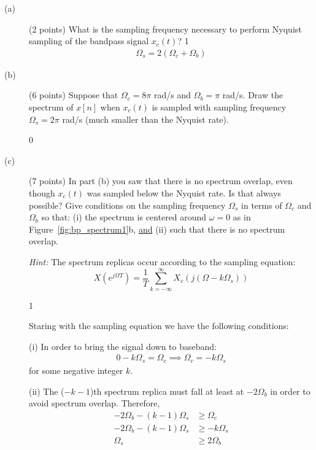 \documentclass[10pt]{article}
\def\SOLUTIONS{1} %
\def\SolutionsColor{red2}
\begin{document}
\begin{description}
\item[(a)] (2 points) What is the sampling frequency necessary to perform Nyquist sampling of the bandpass signal $x_c(t)$?
\if\SOLUTIONS1
{\color{\SolutionsColor}
\begin{align*}
\Omega_{s} = 2(\Omega_c + \Omega_b)
\end{align*}
}
\else\vspace{1cm}
\fi

\item[(b)] (6 points) Suppose that $\Omega_c = 8\pi$ rad/s and $\Omega_b = \pi$ rad/s. Draw the spectrum of $x[n]$ when $x_c(t)$ is sampled with sampling frequency $\Omega_s = 2\pi$ rad/s  (much smaller than the Nyquist rate). 

\begin{figure}[!h]
\centering
	\resizebox{\textwidth}{!}{}\label{fig:bp_spectrum_sol1}
\end{figure}
\if\SOLUTIONS0\vspace{5cm}
\fi

\item[(c)] (7 points) In part (b) you saw that there is no spectrum overlap, even though $x_c(t)$ was sampled below the Nyquist rate. Is that always possible? Give conditions on the sampling frequency $\Omega_s$ in terms of $\Omega_c$ and $\Omega_b$ so that: (i) the spectrum is centered around $\omega = 0$ as in Figure~\ref{fig:bp_spectrum1}b, \underline{and} (ii) such that there is no spectrum overlap. 

\textit{Hint:} The spectrum replicas occur according to the sampling equation:
\begin{equation}
X(e^{j\Omega T}) = \frac{1}{T}\sum_{k=-\infty}^\infty X_c(j(\Omega-k\Omega_s))
\end{equation}

\if\SOLUTIONS1
{\color{\SolutionsColor}
Staring with the sampling equation we have the following conditions:

(i) In order to bring the signal down to baseband:
\begin{align*}
0 - k\Omega_s = \Omega_c \implies \Omega_c = -k\Omega_s
\end{align*}
for some negative integer $k$.

(ii) The ($-k-1$)th spectrum replica must fall at least at $-2\Omega_b$ in order to avoid spectrum overlap. Therefore, 
\begin{align*} \nonumber
-2\Omega_b - (k-1)\Omega_s &\geq \Omega_c \\ \nonumber
-2\Omega_b - (k-1)\Omega_s &\geq -k\Omega_s \tag{since $\Omega_c = -k\Omega_s$} \\
\Omega_s &\geq 2\Omega_b
\end{align*}
}
\else\vspace{10cm}
\fi



\end{description}
\end{document}
